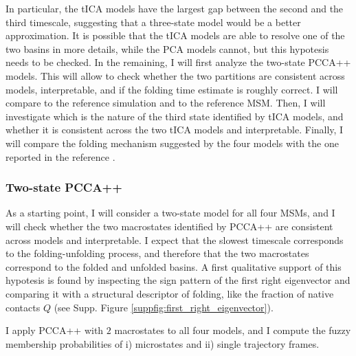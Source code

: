 \documentclass[prl,twocolumn]{revtex4-1}
\begin{document}
In particular, the tICA models have the largest gap between the second and the third timescale, suggesting that a three-state model would be a better approximation. It is possible that the tICA models are able to resolve one of the two basins in more details, while the PCA models cannot, but this hypotesis needs to be checked. 
In the remaining, I will first analyze the two-state PCCA++ models. This will allow to check whether the two partitions are consistent across models, interpretable, and if the folding time estimate is roughly correct. I will compare to the reference simulation and to the reference MSM.
Then, I will investigate which is the nature of the third state identified by tICA models, and whether it is consistent across the two tICA models and interpretable. Finally, I will compare the folding mechanism suggested by the four models with the one reported in the reference \cite{hierarchical_hp35}.


\subsubsection{Two-state PCCA++}
As a starting point, I will consider a two-state model for all four MSMs, and I will check whether the two macrostates identified by PCCA++ are consistent across models and interpretable.
I expect that the slowest timescale corresponds to the folding-unfolding process, and therefore that the two macrostates correspond to the folded and unfolded basins. A first qualitative
support of this hypotesis is found by inspecting the sign pattern of the first right eigenvector and comparing it with a structural descriptor of folding, like the fraction of native contacts $Q$ (see Supp. Figure \ref{suppfig:first_right_eigenvector}).

I apply PCCA++ with $2$ macrostates to all four models, and I compute the fuzzy membership probabilities of  i) microstates and ii) single trajectory frames.
\end{document}
